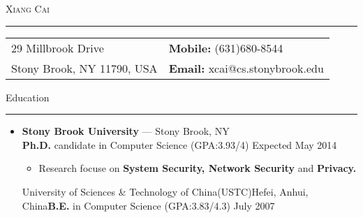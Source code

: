 \documentclass[11pt,oneside]{article}
\makeatletter
\newcommand{\name}{Xiang Cai\xspace}
\newcommand{\addrlinea}{29 Millbrook Drive\xspace}
\newcommand{\addrlineb}{Stony Brook, NY 11790, USA\xspace}
\newcommand{\phone}{\hfill \textbf{Mobile: }(631)680-8544\xspace}
\newcommand{\email}{\hfill \textbf{Email: }xcai@cs.stonybrook.edu\xspace}
\newcommand{\bigname}[1]{
	\begin{center}\fontfamily{phv}\selectfont\Huge\scshape#1\end{center}
}
\newcommand{\contact}[1]{
	\begin{flushleft}\fontfamily{phv}\selectfont\Huge\Large#1\end{flushleft}
}
\newenvironment{ressection}[1]{
	{\fontfamily{phv}\selectfont\Large#1}
	
	\vspace{-8pt} \rule{\textwidth}{.5pt}
	
	\vspace{-4pt}
	\begin{itemize}
	\vspace{.5pt}
}{
	\end{itemize}
}
\newcommand{\resitem}[1]{
	\vspace{2pt}
	\item \begin{flushleft} #1 \end{flushleft}
}
\newcommand{\ressubitem}[1]{
	\vspace{-4pt}
	\item \begin{flushleft} #1 \end{flushleft}
}
\newcommand{\resbigitem}[3]{
	\vspace{-5pt}
	\item
	\textbf{#1} --- #2 \\
	{#3}
}
\newenvironment{ressubsec}[3]{
	\resbigitem{#1}{#2}{#3}
	\vspace{-4pt}
	\begin{itemize}
}{
	\end{itemize}
}
\newenvironment{ressubsec_empty}[3]{
	\resbigitem{#1}{#2}{#3}
	\vspace{-2pt}
}
\makeatother
\begin{document}
\bigname{\name}

\vspace{-8pt} \rule{\textwidth}{1pt}



\vspace{-6pt}
\begin{table}[h]
\begin{tabular}[h]{p{}p{}}
\addrlinea & \phone \\
\addrlineb & \email \\
\end{tabular}
\end{table}

\vspace{-4pt}




\begin{ressection}{Education}

	\begin{ressubsec}{Stony Brook University}{Stony Brook, NY}{\textbf{Ph.D.} candidate
		in Computer Science (GPA:3.93/4) \hfill Expected May 2014}
		\ressubitem{Research focuse on \textbf{System Security, Network Security} and \textbf{Privacy.}
		}
		
	\end{ressubsec}

	\vspace{-4pt}
	\begin{ressubsec_empty}{University of Sciences \& Technology of
		China(USTC)}{Hefei, Anhui, China}{\textbf{B.E.} in Computer
			Science (GPA:3.83/4.3) \hfill July 2007}
	\end{ressubsec_empty}


\end{ressection}
\end{document}
